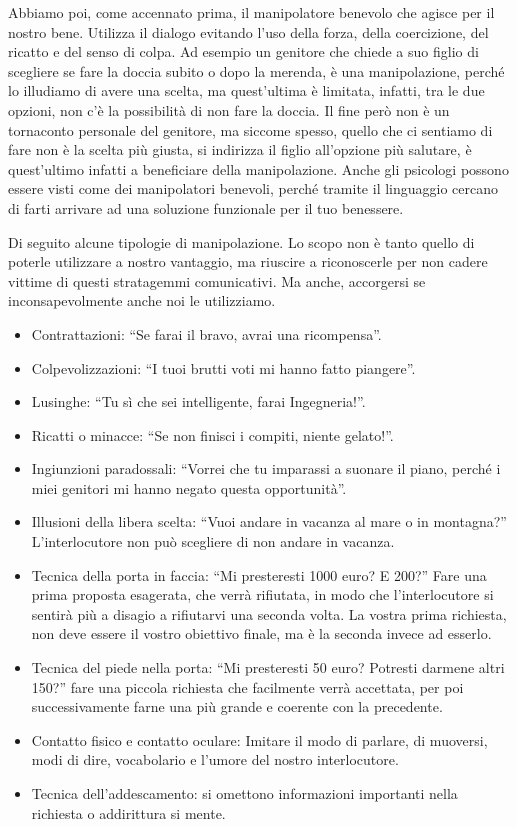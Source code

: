 \documentclass[12pt]{book} %
\begin{document}
Abbiamo poi, come accennato prima, il manipolatore benevolo che agisce per il nostro bene. Utilizza il dialogo evitando
l'uso della forza, della coercizione, del ricatto e del senso di colpa. Ad esempio un genitore che
chiede a suo figlio di scegliere se fare la doccia subito o dopo la merenda, è una manipolazione, perché lo illudiamo
di avere una scelta, ma quest'ultima è limitata, infatti, tra le due opzioni, non
c'è la possibilità di non fare la doccia. Il fine però non è un tornaconto personale del genitore,
ma siccome spesso, quello che ci sentiamo di fare non è la scelta più giusta, si indirizza il figlio
all'opzione più salutare, è quest'ultimo infatti a beneficiare della
manipolazione. Anche gli psicologi possono essere visti come dei manipolatori benevoli, perché tramite il linguaggio cercano di farti
arrivare ad una soluzione funzionale per il tuo benessere.

Di seguito alcune tipologie di manipolazione. Lo scopo non è tanto quello di poterle utilizzare a nostro vantaggio, ma
riuscire a riconoscerle per non cadere vittime di questi stratagemmi comunicativi. Ma anche, accorgersi se
inconsapevolmente anche noi le utilizziamo.

\begin{itemize}
\item Contrattazioni: “Se farai il bravo, avrai una ricompensa”. 
\item Colpevolizzazioni: “I tuoi brutti voti mi hanno fatto piangere”. 
\item Lusinghe: “Tu sì che sei intelligente, farai Ingegneria!”. 
\item Ricatti o minacce: “Se non finisci i compiti, niente gelato!”. 
\item Ingiunzioni paradossali: “Vorrei che tu imparassi a suonare il piano, perché i miei genitori mi hanno negato questa opportunità”. 
\item Illusioni della libera scelta: “Vuoi andare in vacanza al mare o in montagna?”
L'interlocutore non può scegliere di non andare in vacanza.
\item Tecnica della porta in faccia: “Mi presteresti 1000 euro? E 200?” Fare una prima proposta esagerata, che verrà
rifiutata, in modo che l'interlocutore si sentirà più a disagio a rifiutarvi una seconda volta. La
vostra prima richiesta, non deve essere il vostro obiettivo finale, ma è la seconda invece ad esserlo.
\item Tecnica del piede nella porta: “Mi presteresti 50 euro? Potresti darmene altri 150?” fare una piccola richiesta
che facilmente verrà accettata, per poi successivamente farne una più grande e coerente con la precedente.
\item Contatto fisico e contatto oculare: Imitare il modo di parlare, di muoversi, modi di dire, vocabolario e l'umore del nostro interlocutore.
\item Tecnica dell'addescamento: si omettono informazioni importanti nella richiesta o addirittura si mente.
\end{itemize}
\end{document}
